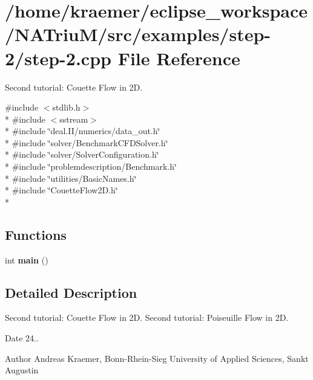 \hypertarget{step-2_8cpp}{\section{/home/kraemer/eclipse\-\_\-workspace/\-N\-A\-Triu\-M/src/examples/step-\/2/step-\/2.cpp File Reference}
\label{step-2_8cpp}
}


Second tutorial\-: Couette Flow in 2\-D.  


{\ttfamily \#include $<$stdlib.\-h$>$}\\*
{\ttfamily \#include $<$sstream$>$}\\*
{\ttfamily \#include \char`\"{}deal.\-I\-I/numerics/data\-\_\-out.\-h\char`\"{}}\\*
{\ttfamily \#include \char`\"{}solver/\-Benchmark\-C\-F\-D\-Solver.\-h\char`\"{}}\\*
{\ttfamily \#include \char`\"{}solver/\-Solver\-Configuration.\-h\char`\"{}}\\*
{\ttfamily \#include \char`\"{}problemdescription/\-Benchmark.\-h\char`\"{}}\\*
{\ttfamily \#include \char`\"{}utilities/\-Basic\-Names.\-h\char`\"{}}\\*
{\ttfamily \#include \char`\"{}Couette\-Flow2\-D.\-h\char`\"{}}\\*
\subsection*{Functions}
\begin{DoxyCompactItemize}
\item 
\hypertarget{step-2_8cpp_ae66f6b31b5ad750f1fe042a706a4e3d4}{int {\bfseries main} ()}\label{step-2_8cpp_ae66f6b31b5ad750f1fe042a706a4e3d4}

\end{DoxyCompactItemize}


\subsection{Detailed Description}
Second tutorial\-: Couette Flow in 2\-D. Second tutorial\-: Poiseuille Flow in 2\-D.

\begin{DoxyDate}{Date}
24.. 
\end{DoxyDate}
\begin{DoxyAuthor}{Author}
Andreas Kraemer, Bonn-\/\-Rhein-\/\-Sieg University of Applied Sciences, Sankt Augustin 
\end{DoxyAuthor}
